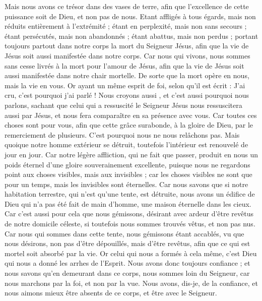 \begin{multicols}{2}
Mais nous avons ce trésor dans des vases de terre, afin que l'excellence de cette puissance soit de Dieu, et non pas de nous.
Etant affligés à tous égards, mais non réduits entièrement à l’extrémité ; étant en perplexité, mais non sans secours ;
étant persécutés, mais non abandonnés ; étant abattus, mais non perdus ;
portant toujours partout dans notre corps la mort du Seigneur Jésus, afin que la vie de Jésus soit aussi manifestée dans notre corps.
Car nous qui vivons, nous sommes sans cesse livrés à la mort pour l'amour de Jésus, afin que la vie de Jésus soit aussi manifestée dans notre chair mortelle.
De sorte que la mort opère en nous, mais la vie en vous.
Or ayant un même esprit de foi, selon qu'il est écrit : J'ai cru, c'est pourquoi j'ai parlé ! Nous croyons aussi , et c'est aussi pourquoi nous parlons,
sachant que celui qui a ressuscité le Seigneur Jésus nous ressuscitera aussi par Jésus, et nous fera comparaître en sa présence avec vous.
Car toutes ces choses sont pour vous, afin que cette grâce surabonde, à la gloire de Dieu, par le remerciement de plusieurs.
C'est pourquoi nous ne nous relâchons pas. Mais quoique notre homme extérieur se détruit, toutefois l'intérieur est renouvelé de jour en jour.
Car notre légère affliction, qui ne fait que passer, produit en nous un poids éternel d'une gloire souverainement excellente,
puisque nous ne regardons point aux choses visibles, mais aux invisibles ; car les choses visibles ne sont que pour un temps, mais les invisibles sont éternelles.
\VerseOne{} Car nous savons que si notre habitation terrestre, qui n'est qu'une tente, est détruite, nous avons un édifice de Dieu qui n’a pas été fait de main d’homme, une maison éternelle dans les cieux.
Car c'est aussi pour cela que nous gémissons, désirant avec ardeur d'être revêtus de notre domicile céleste,
si toutefois nous sommes trouvés vêtus, et non pas nus.
Car nous qui sommes dans cette tente, nous gémissons étant accablés, vu que nous désirons, non pas d'être dépouillés, mais d'être revêtus, afin que ce qui est mortel soit absorbé par la vie.
Or celui qui nous a formés à cela même, c'est Dieu qui nous a donné les arrhes de l'Esprit.
Nous avons donc toujours confiance ; et nous savons qu'en demeurant dans ce corps, nous sommes loin du Seigneur,
car nous marchons par la foi, et non par la vue.
Nous avons, dis-je, de la confiance, et nous aimons mieux être absents de ce corps, et être avec le Seigneur.

\end{multicols}
